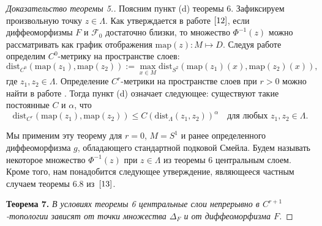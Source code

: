 \documentclass[12pt]{article}
\begin{document}
\begin{proof}[Доказательство теоремы 5.]
Поясним пункт (d) теоремы 6. Зафиксируем произвольную точку $z\in\Lambda$. Как утверждается в работе $\cite{12}$, если диффеоморфизмы $F$ и $\mathcal{F}_0$ достаточно близки, то множество $\Phi^{-1}(z)$ можно рассматривать как график отображения 
$\textrm{map}(z):M\mapsto D$. Следуя работе \cite{12} определим $C^0$-метрику на пространстве слоев:
$$\mbox{dist}_{C^0}(\mbox{map}(z_1),\mbox{map}(z_2)):=\max_{x\in M}\mbox{dist}_{S^2}(\mbox{map}(z_1)(x),\mbox{map}(z_2)(x)),$$
где $z_1,z_2\in\Lambda$.
Определение $C^r$-метрики на пространстве слоев при $r>0$ можно найти в работе \cite{12}.%
 Тогда пункт (d) означает следующее: существуют такие постоянные $C$ и $\alpha$, что
$$\textrm{dist}_{C^r}(\mbox{map}(z_1),\mbox{map}(z_2))\leq C(\textrm{dist}_{\Lambda}(z_1,z_2))^{\alpha}\quad\textrm{для любых }z_1,z_2\in\Lambda.$$
%

Мы применим эту теорему для $r=0$, $M=S^1$ и ранее определенного диффеоморфизма $g$, обладающего стандартной подковой Смейла. Будем называть некоторое множество $\Phi^{-1}(z)$ при $z\in\Lambda$ из теоремы 6 центральным слоем. Кроме того, нам понадобится следующее утверждение, являющееся частным случаем теоремы 6.8 из~$\cite{13}$.

\textbf{Теорема 7.} \textit{В условиях теоремы 6 центральные слои непрерывно в $C^{r+1}$-топологии зависят от точки множества $\Delta_F$ и от диффеоморфизма $F$.} 


\end{proof}
\end{document}
